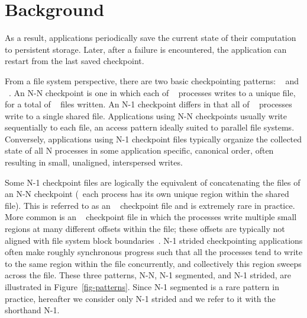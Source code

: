 \section{Background}
\label{motivation}

As a result, applications 
periodically save
the current state of their computation to persistent storage.  Later, after a
failure is encountered, the application can restart from the last saved
checkpoint. 
\fi


From a file system perspective,
there are two basic checkpointing patterns: ~ and ~.  An
N-N checkpoint is one in which each of ~ processes writes to a unique
file, for a total of ~ files written.  An N-1 checkpoint differs in
that all of ~ processes write to a single shared file.  Applications
using N-N checkpoints usually write sequentially to each file, an access
pattern ideally suited to parallel file systems. Conversely, applications using
N-1 checkpoint files typically organize the collected state of all N processes
in some application specific, canonical order, often resulting in 
small, unaligned, interspersed writes.

Some N-1 checkpoint files are logically the equivalent of concatenating the
files of an N-N checkpoint (\ie\ each process has its own unique region
within the shared file).  This is referred to as an ~
checkpoint file and is extremely rare in practice.  More common is an
~ checkpoint file in which the processes write multiple small
regions at many different offsets within the file; these offsets are typically
not aligned with file system block boundaries~\cite{plfs-maps}.  N-1 strided
checkpointing applications often make roughly synchronous progress such that
all the processes tend to write to the same region within the file concurrently, and collectively this region sweeps across the file.
These three patterns, N-N, N-1 segmented, and N-1 strided, are
illustrated in Figure~\ref{fig-patterns}.  Since N-1 segmented is a rare pattern
in practice, hereafter we consider only N-1 strided and we refer to it with the
shorthand N-1. 


